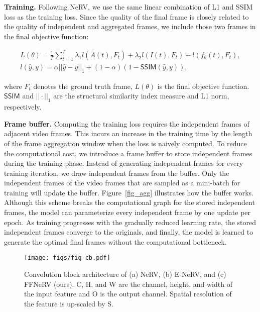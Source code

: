 \documentclass[sigconf]{acmart}
\begin{document}
\noindent\textbf{Training.} Following NeRV, we use the same linear combination of L1 and SSIM loss as the training loss.
Since the quality of the final frame is closely related to the quality of independent and aggregated frames, we include those two frames in the final objective function:
\begin{small}
\begin{equation}
\label{eq_loss}
    \begin{gathered}
    L(\theta) = \frac{1}{T}\sum_{t=1}^{T} \lambda_1 l(\overline{A}(t),F_t) + \lambda_2 l(I(t),F_t) + l(f_\theta(t),F_t), \\
    l(\hat{y},y) = \alpha||\hat{y}-y||_1 + (1-\alpha)(1-\mathsf{SSIM}(\hat{y},y)),
    \end{gathered}
\end{equation}
\end{small}
where $F_t$ denotes the ground truth frame, $L(\theta)$ is the final objective function. $\mathsf{SSIM}$ and $||\cdot||_1$ are the structural similarity index measure and L1 norm, respectively.

\noindent\textbf{Frame buffer.}
Computing the training loss requires the independent frames of adjacent video frames.
This incurs an increase in the training time by the length of the frame aggregation window when the loss is naively computed.
To reduce the computational cost, we introduce a frame buffer to store independent frames during the training phase.
Instead of generating independent frames for every training iteration, we draw independent frames from the buffer.
Only the independent frames of the video frames that are sampled as a mini-batch for training will update the buffer.
Figure~\ref{fig_agg} illustrates how the buffer works.
Although this scheme breaks the computational graph for the stored independent frames, the model can parameterize every independent frame by one update per epoch.
As training progresses with the gradually reduced learning rate, the stored independent frames converge to the originals, and finally, the model is learned to generate the optimal final frames without the computational bottleneck.





\begin{figure}[t]
\begin{center}
\texttt{[image: figs/fig\_cb.pdf]}
\end{center}
   \caption{Convolution block architecture of (a) NeRV, (b) E-NeRV, and (c) FFNeRV (ours). C, H, and W are the channel, height, and width of the input feature and O is the output channel. Spatial resolution of the feature is up-scaled by S.}
\label{fig_cb}
\end{figure}
\end{document}
